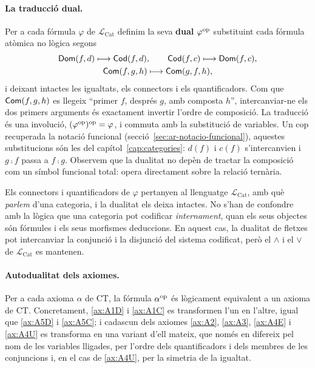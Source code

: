 \paragraph{La traducció dual.}
Per a cada fórmula $\varphi$ de $\mathcal L_{\mathrm{Cat}}$ definim la seva \textbf{dual} $\varphi^{\mathrm{op}}$ substituint cada fórmula atòmica no lògica segons
\begin{gather*}
\mathsf{Dom}(f,d)\longmapsto\mathsf{Cod}(f,d),\qquad
\mathsf{Cod}(f,c)\longmapsto\mathsf{Dom}(f,c),\\
\mathsf{Com}(f,g,h)\longmapsto\mathsf{Com}(g,f,h),
\end{gather*}
i deixant intactes les igualtats, els connectors i els quantificadors. Com que $\mathsf{Com}(f,g,h)$ es llegeix \enquote{primer $f$, després $g$, amb composta $h$}, intercanviar-ne els dos primers arguments és exactament invertir l'ordre de composició. La traducció és una involució, $(\varphi^{\mathrm{op}})^{\mathrm{op}}=\varphi$, i commuta amb la substitució de variables. Un cop recuperada la notació funcional (secció~\ref{sec:ar-notacio-funcional}), aquestes substitucions són les del capítol~\ref{cap:categories}: $d(f)$ i $c(f)$ s'intercanvien i $g\comp f$ passa a $f\comp g$. Observem que la dualitat no depèn de tractar la composició com un símbol funcional total: opera directament sobre la relació ternària.

\begin{observacio}
Els connectors i quantificadors de $\varphi$ pertanyen al llenguatge $\mathcal L_{\mathrm{Cat}}$, amb què \emph{parlem} d'una categoria, i la dualitat els deixa intactes. No s'han de confondre amb la lògica que una categoria pot codificar \emph{internament}, quan els seus objectes són fórmules i els seus morfismes deduccions. En aquest cas, la dualitat de fletxes pot intercanviar la conjunció i la disjunció del sistema codificat, però el $\land$ i el $\lor$ de $\mathcal L_{\mathrm{Cat}}$ es mantenen.
\end{observacio}

\paragraph{Autodualitat dels axiomes.}\leavevmode\par

\begin{lema}\label{lema:ar-autodual}
Per a cada axioma $\alpha$ de $\mathrm{CT}$, la fórmula $\alpha^{\mathrm{op}}$ és lògicament equivalent a un axioma de $\mathrm{CT}$. Concretament, \eqref{ax:A1D} i \eqref{ax:A1C} es transformen l'un en l'altre, igual que \eqref{ax:A5D} i \eqref{ax:A5C}; i cadascun dels axiomes \eqref{ax:A2}, \eqref{ax:A3}, \eqref{ax:A4E} i \eqref{ax:A4U} es transforma en una variant d'ell mateix, que només en difereix pel nom de les variables lligades, per l'ordre dels quantificadors i dels membres de les conjuncions i, en el cas de \eqref{ax:A4U}, per la simetria de la igualtat.
\end{lema}

